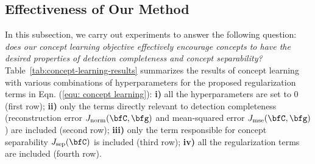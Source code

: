 \subsection{Effectiveness of Our Method}
In this subsection, we carry out experiments to answer the following question: \textit{does our concept learning objective effectively encourage concepts to have the desired properties of detection completeness and concept separability?}
%
Table~\ref{tab:concept-learning-results} summarizes the results of concept learning with various combinations of hyperparameters for the proposed regularization terms in Eqn. (\ref{equ: concept learning}): \textbf{i)} all the hyperparameters are set to $0$ (first row); \textbf{ii)} only the terms directly relevant to detection completeness (\ie reconstruction error $J_{\textrm{norm}}(\bfC, \bfg)$ and mean-squared error $J_{\textrm{mse}}(\bfC, \bfg)$) are included (second row); \textbf{iii)} only the term responsible for concept separability $J_{\textrm{sep}}(\bfC)$ is included (third row); \textbf{iv)} all the regularization terms are included (fourth row).

